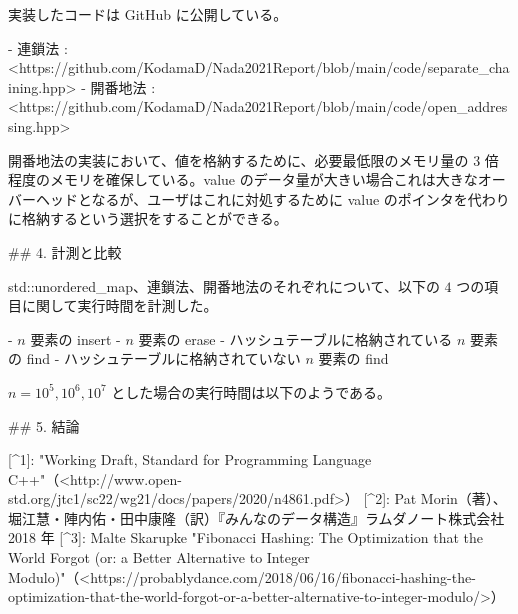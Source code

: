 実装したコードは GitHub に公開している。

- 連鎖法 : <https://github.com/KodamaD/Nada2021Report/blob/main/code/separate_chaining.hpp>
- 開番地法 : <https://github.com/KodamaD/Nada2021Report/blob/main/code/open_addressing.hpp>

開番地法の実装において、値を格納するために、必要最低限のメモリ量の $3$ 倍程度のメモリを確保している。value のデータ量が大きい場合これは大きなオーバーヘッドとなるが、ユーザはこれに対処するために value のポインタを代わりに格納するという選択をすることができる。

## 4. 計測と比較

std::unordered_map、連鎖法、開番地法のそれぞれについて、以下の $4$ つの項目に関して実行時間を計測した。

- $n$ 要素の insert
- $n$ 要素の erase
- ハッシュテーブルに格納されている $n$ 要素の find
- ハッシュテーブルに格納されていない $n$ 要素の find

$n = 10^5, 10^6, 10^7$ とした場合の実行時間は以下のようである。

## 5. 結論

[^1]: "Working Draft, Standard for Programming Language C++"（<http://www.open-std.org/jtc1/sc22/wg21/docs/papers/2020/n4861.pdf>）
[^2]: Pat Morin（著）、堀江慧・陣内佑・田中康隆（訳）『みんなのデータ構造』ラムダノート株式会社 2018 年
[^3]: Malte Skarupke "Fibonacci Hashing: The Optimization that the World Forgot (or: a Better Alternative to Integer Modulo)"（<https://probablydance.com/2018/06/16/fibonacci-hashing-the-optimization-that-the-world-forgot-or-a-better-alternative-to-integer-modulo/>）
